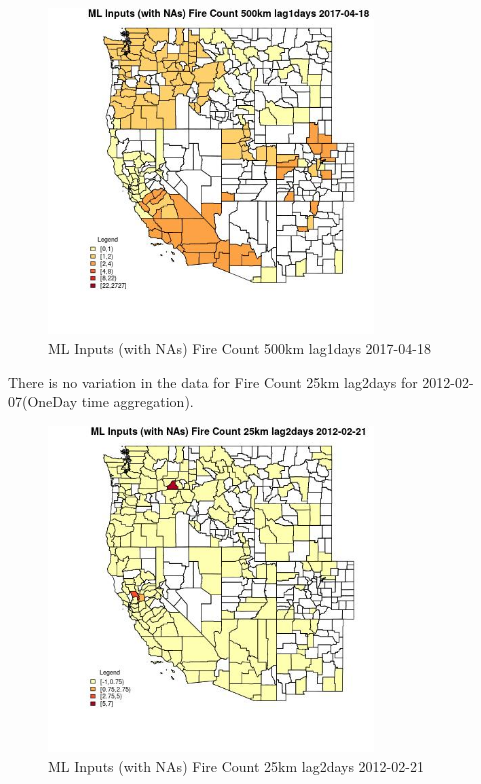 \begin{figure} 
\centering  
\includegraphics[width=0.77\textwidth]{Code_Outputs/Report_ML_input_PM25_Step4_part_f_de_duplicated_aveswNAs_CountyFire_Count_500km_lag1daysMean2017-04-18.jpg} 
\caption{\label{fig:Report_ML_input_PM25_Step4_part_f_de_duplicated_aveswNAsCountyFire_Count_500km_lag1daysMean2017-04-18}ML Inputs (with NAs) Fire Count 500km lag1days 2017-04-18} 
\end{figure} 
 

There is no variation in the data for Fire Count 25km lag2days for 2012-02-07(OneDay time aggregation). 
 

\begin{figure} 
\centering  
\includegraphics[width=0.77\textwidth]{Code_Outputs/Report_ML_input_PM25_Step4_part_f_de_duplicated_aveswNAs_CountyFire_Count_25km_lag2daysMean2012-02-21.jpg} 
\caption{\label{fig:Report_ML_input_PM25_Step4_part_f_de_duplicated_aveswNAsCountyFire_Count_25km_lag2daysMean2012-02-21}ML Inputs (with NAs) Fire Count 25km lag2days 2012-02-21} 
\end{figure} 
 

